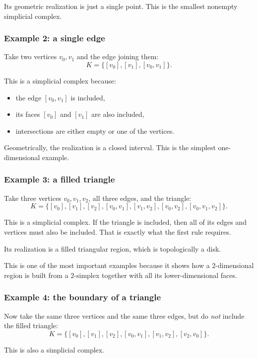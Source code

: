 \documentclass[12pt,a4paper]{article}
\theoremstyle{notespace}
\begin{document}
Its geometric realization is just a single point. This is the smallest nonempty simplicial complex.

\subsubsection{Example 2: a single edge}

Take two vertices \(v_0,v_1\) and the edge joining them:
\[
K=\{[v_0],[v_1],[v_0,v_1]\}.
\]

This is a simplicial complex because:
\begin{itemize}
	\item the edge \([v_0,v_1]\) is included,
	\item its faces \([v_0]\) and \([v_1]\) are also included,
	\item intersections are either empty or one of the vertices.
\end{itemize}

Geometrically, the realization is a closed interval. This is the simplest one-dimensional example.

\subsubsection{Example 3: a filled triangle}

Take three vertices \(v_0,v_1,v_2\), all three edges, and the triangle:
\[
K=
\{
[v_0],[v_1],[v_2],
[v_0,v_1],[v_1,v_2],[v_0,v_2],
[v_0,v_1,v_2]
\}.
\]

This is a simplicial complex. If the triangle is included, then all of its edges and vertices must also be included. That is exactly what the first rule requires.

Its realization is a filled triangular region, which is topologically a disk.

This is one of the most important examples because it shows how a \(2\)-dimensional region is built from a \(2\)-simplex together with all its lower-dimensional faces.

\subsubsection{Example 4: the boundary of a triangle}

Now take the same three vertices and the same three edges, but do \emph{not} include the filled triangle:
\[
K=
\{
[v_0],[v_1],[v_2],
[v_0,v_1],[v_1,v_2],[v_2,v_0]
\}.
\]

This is also a simplicial complex.
\end{document}
